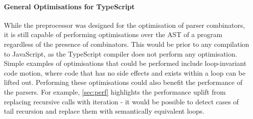 \paragraph*{General Optimisations for TypeScript}

While the preprocessor was designed for the optimisation of parser combinators, it is still capable of performing optimisations over the AST of a program regardless of the presence of combinators.
This would be prior to any compilation to JavaScript, as the TypeScript compiler does not perform any optimisation.
Simple examples of optimisations that could be performed include loop-invariant code motion, where code that has no side effects and exists within a loop can be lifted out.
Performing these optimisations could also benefit the performance of the parsers.
For example, \autoref{sec:perf} highlights the performance uplift from replacing recursive calls with iteration - it would be possible to detect cases of tail recursion and replace them with semantically equivalent loops.
